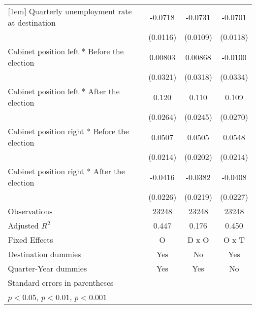\begin{table}[htbp]
\begin{tabular}{l*{3}{c}}
[1em]
Quarterly unemployment rate at destination&     -0.0718\sym{***}&     -0.0731\sym{***}&     -0.0701\sym{***}\\
                    &    (0.0116)         &    (0.0109)         &    (0.0118)         \\
[1em]
Cabinet position left * Before the election&     0.00803         &     0.00868         &     -0.0100         \\
                    &    (0.0321)         &    (0.0318)         &    (0.0334)         \\
[1em]
Cabinet position left * After the election&       0.120\sym{***}&       0.110\sym{***}&       0.109\sym{***}\\
                    &    (0.0264)         &    (0.0245)         &    (0.0270)         \\
[1em]
Cabinet position right * Before the election&      0.0507\sym{*}  &      0.0505\sym{*}  &      0.0548\sym{*}  \\
                    &    (0.0214)         &    (0.0202)         &    (0.0214)         \\
[1em]
Cabinet position right * After the election&     -0.0416         &     -0.0382         &     -0.0408         \\
                    &    (0.0226)         &    (0.0219)         &    (0.0227)         \\
\hline
Observations        &       23248         &       23248         &       23248         \\
Adjusted \(R^{2}\)  &       0.447         &       0.176         &       0.450         \\
Fixed Effects       &           O         &       D x O         &       O x T         \\
Destination dummies &         Yes         &          No         &         Yes         \\
Quarter-Year dummies&         Yes         &         Yes         &          No         \\
\hline\hline
\multicolumn{4}{l}{\footnotesize Standard errors in parentheses}\\
\multicolumn{4}{l}{\footnotesize \sym{*} \(p<0.05\), \sym{**} \(p<0.01\), \sym{***} \(p<0.001\)}\\
\end{tabular}
\end{table}

